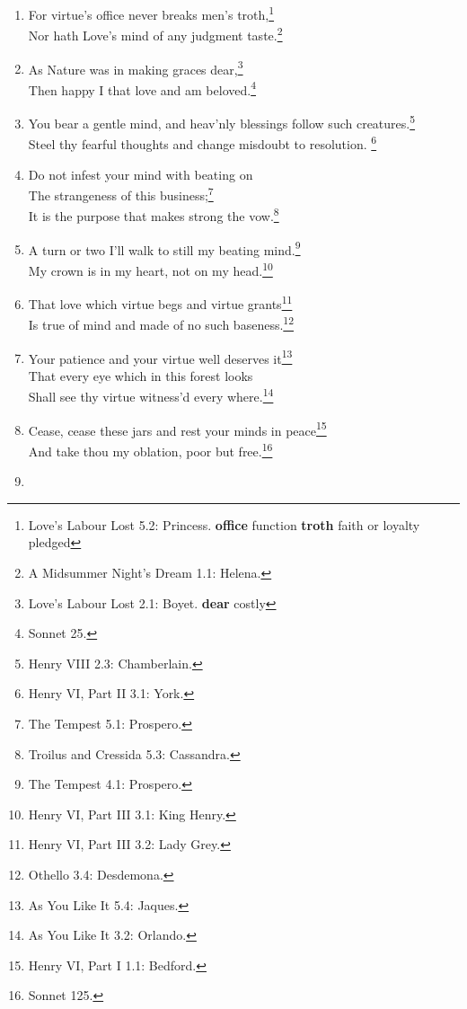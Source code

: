 \documentclass[17pt,twoside]{extarticle}
\begin{document}
\begin{enumerate}
  Divert strong minds to the course of alt'ring things.\footnote{Sonnet
    115.}\\Where words are scarce, they are seldom spent in
  vain.\footnote{Richard II 2.1: Gaunt.}
\item
  For virtue's office never breaks men's troth,\footnote{Love's Labour
    Lost 5.2: Princess. \textbf{office} function \textbf{troth} faith or
    loyalty pledged}\\Nor hath Love's mind of any judgment
  taste.\footnote{A Midsummer Night's Dream 1.1: Helena.}
\item
  As Nature was in making graces dear,\footnote{Love's Labour Lost 2.1:
    Boyet. \textbf{dear} costly}\\Then happy I that love and am
  beloved.\footnote{Sonnet 25.}
\item
  You bear a gentle mind, and heav'nly blessings follow such
  creatures.\footnote{Henry VIII 2.3: Chamberlain.}\\Steel thy fearful
  thoughts and change misdoubt to resolution. \footnote{Henry VI, Part
    II 3.1: York.}
\item
  Do not infest your mind with beating on\\The strangeness of this
  business;\footnote{The Tempest 5.1: Prospero.}\\It is the purpose that
  makes strong the vow.\footnote{Troilus and Cressida 5.3: Cassandra.}
\item
  A turn or two I'll walk to still my beating mind.\footnote{The Tempest
    4.1: Prospero.}\\My crown is in my heart, not on my head.\footnote{Henry
    VI, Part III 3.1: King Henry.}
\item
  That love which virtue begs and virtue grants\footnote{Henry VI, Part
    III 3.2: Lady Grey.}\\Is true of mind and made of no such
  baseness.\footnote{Othello 3.4: Desdemona.}
\item
  Your patience and your virtue well deserves it\footnote{As You Like It
    5.4: Jaques.}\\That every eye which in this forest looks\\Shall see
  thy virtue witness'd every where.\footnote{As You Like It 3.2:
    Orlando.}
\item
  Cease, cease these jars and rest your minds in peace\footnote{Henry
    VI, Part I 1.1: Bedford.}\\And take thou my oblation, poor but
  free.\footnote{Sonnet 125.}
\item

\end{enumerate}
\end{document}
